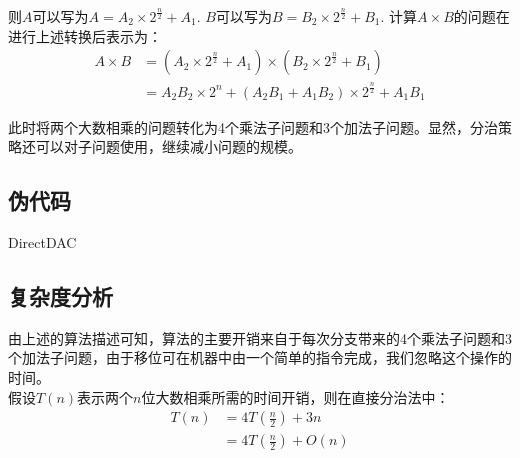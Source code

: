 则$A$可以写为$A = A_2 \times 2^{\frac{n}{2}} + A_1$.
$B$可以写为$B = B_2 \times 2^{\frac{n}{2}} + B_1$.
计算$A \times B$的问题在进行上述转换后表示为：
\begin{displaymath}
    \begin{split}
        A \times B
        & = (A_2 \times 2^{\frac{n}{2}} + A_1) \times (B_2 \times 2^{\frac{n}{2}} + B_1) \\
        & = A_2 B_2 \times 2^n + (A_2 B_1 + A_1 B_2) \times 2^{\frac{n}{2}} + A_1 B_1
    \end{split}
\end{displaymath}

此时将两个大数相乘的问题转化为4个乘法子问题和3个加法子问题。显然，分治策略还可以对子问题使用，继续减小问题的规模。

\subsection{伪代码}
\begin{algorithm}
    \DontPrintSemicolon{}
    \caption{DirectDAC\label{label_for_pseudo_DirectDAC}}
\end{algorithm}

\subsection{复杂度分析}
由上述的算法描述可知，算法的主要开销来自于每次分支带来的4个乘法子问题和3个加法子问题，由于移位可在机器中由一个简单的指令完成，我们忽略这个操作的时间。\\
假设$T(n)$表示两个$n$位大数相乘所需的时间开销，则在直接分治法中：
\begin{displaymath}
    \begin{split}
        T(n)
        &= 4T(\frac{n}{2}) + 3n \\
        &= 4T(\frac{n}{2}) + O(n)
    \end{split}
\end{displaymath}

